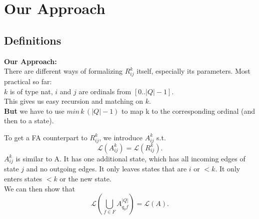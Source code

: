 \documentclass{beamer}
\begin{document}
\section{Our Approach}
\subsection*{Definitions}
\begin{frame}
    \textbf{Our Approach:} \\

    There are different ways of formalizing $R^k_{i j}$ itself, especially its parameters. Most practical so far: \\
    $k$ is of type nat, $i$ and $j$ are ordinals from $[0..|Q|-1]$.\\
    \pause
    This gives us easy recursion and matching on $k$.\\
    \pause
    \textbf{But} we have to use $min \, k \, (|Q|-1)$ to map k to the corresponding ordinal (and then to a state).

\end{frame}

\begin{frame}
    To get a FA counterpart to $R^k_{i j}$, we introduce $A^k_{i j}$ s.t.
    \[
        \mathcal{L}(A^k_{i j}) = \mathcal{L}(R^k_{i j}).
    \]
    $A^k_{i j}$ is similar to A. It has one additional state, which has all incoming edges of state $j$ and no outgoing edges. It only leaves states that are $i$ or  $<k$. It only enters states $<k$ or the new state.
    \\
    We can then show that  
    \[
        \mathcal{L}(\bigcup_{f \in F} A^{|Q|}_{q_0 f}) = \mathcal{L}(A).
    \]
\end{frame}
\end{document}
